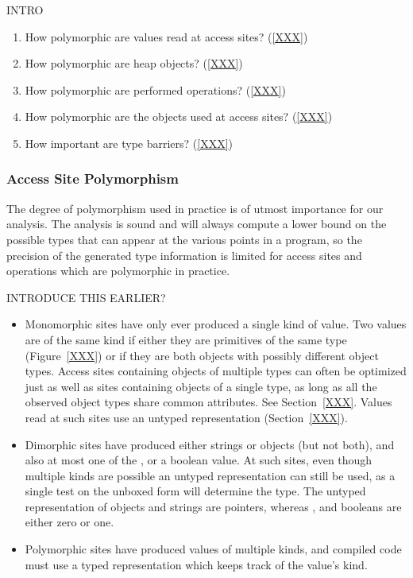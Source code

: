 INTRO %

\begin{enumerate}

\item How polymorphic are values read at access sites?  (\ref{XXX})

\item How polymorphic are heap objects?  (\ref{XXX})

\item How polymorphic are performed operations?  (\ref{XXX})

\item How polymorphic are the objects used at access sites?  (\ref{XXX})

\item How important are type barriers?  (\ref{XXX})

\end{enumerate}

\subsubsection{Access Site Polymorphism}

The degree of polymorphism used in practice is of utmost importance
for our analysis.
The analysis is sound and will always compute a lower bound on the possible
types that can appear at the various points in a program,
so the precision of the generated type information is limited for
access sites and operations which are polymorphic in practice.

INTRODUCE THIS EARLIER?

\begin{itemize}

\item Monomorphic sites have only ever produced a single kind of value.
Two values are of the same kind if either they are primitives of the same
type (Figure~\ref{XXX}) or if they are both objects with possibly different
object types.
Access sites containing objects of multiple types can often be optimized
just as well as sites containing objects of a single type, as long as
all the observed object types share common attributes. See Section~\ref{XXX}.
Values read at such sites use an untyped representation (Section~\ref{XXX}).

\item Dimorphic sites have produced either strings or objects (but not both),
and also at most one of the ,  or a boolean value.
At such sites, even though multiple kinds are possible an untyped
representation can still be used,
as a single test on the unboxed form will determine the type.
The untyped representation of objects and strings are pointers,
whereas ,  and booleans are either zero or one.

\item Polymorphic sites have produced values of multiple kinds,
and compiled code must use a typed representation which keeps track of
the value's kind.

\end{itemize}


